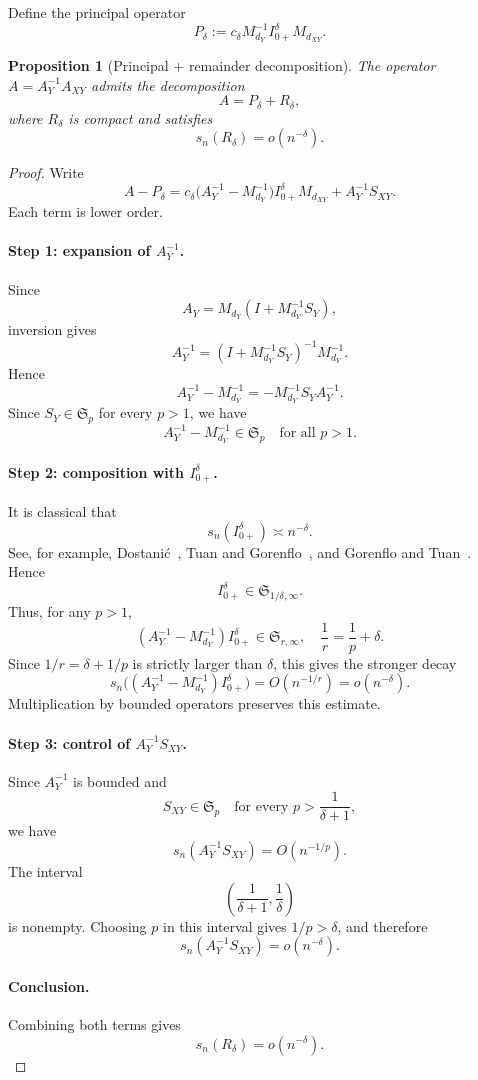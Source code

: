 \documentclass[11pt,a4paper]{amsart}
\theoremstyle{plain}
\newtheorem{proposition}[theorem]{Proposition}
\theoremstyle{definition}
\theoremstyle{remark}
\begin{document}
Define the principal operator
\[
P_\delta := c_\delta M_{d_Y}^{-1} I_{0+}^{\delta} M_{d_{XY}}.
\]

\begin{proposition}[Principal + remainder decomposition]\label{prop:A_decomposition}
The operator $A = A_Y^{-1} A_{XY}$ admits the decomposition
\[
A = P_\delta + R_\delta,
\]
where $R_\delta$ is compact and satisfies
\[
s_n(R_\delta) = o(n^{-\delta}).
\]
\end{proposition}

\begin{proof}
Write
\[
A - P_\delta
=
c_\delta \bigl(A_Y^{-1} - M_{d_Y}^{-1}\bigr) I_{0+}^{\delta} M_{d_{XY}}
+
A_Y^{-1} S_{XY}.
\]
Each term is lower order.

\paragraph{Step 1: expansion of $A_Y^{-1}$.}
Since
\[
A_Y = M_{d_Y}(I + M_{d_Y}^{-1} S_Y),
\]
inversion gives
\[
A_Y^{-1} = (I + M_{d_Y}^{-1} S_Y)^{-1} M_{d_Y}^{-1}.
\]
Hence
\[
A_Y^{-1} - M_{d_Y}^{-1}
=
- M_{d_Y}^{-1} S_Y A_Y^{-1}.
\]
Since $S_Y \in \mathfrak S_p$ for every $p>1$, we have
\[
A_Y^{-1} - M_{d_Y}^{-1} \in \mathfrak S_p
\quad\text{for all } p>1.
\]

\paragraph{Step 2: composition with $I_{0+}^{\delta}$.}
It is classical that
\[
s_n(I_{0+}^{\delta}) \asymp n^{-\delta}.
\]
See, for example, Dostani\'c~\cite{Dos93}, Tuan and Gorenflo~\cite{TG94}, and
Gorenflo and Tuan~\cite{GT95}.
Hence
\[
I_{0+}^{\delta} \in \mathfrak S_{1/\delta,\infty}.
\]
Thus, for any $p>1$,
\[
(A_Y^{-1} - M_{d_Y}^{-1}) I_{0+}^{\delta}
\in \mathfrak S_{r,\infty},
\quad
\frac1r = \frac1p + \delta.
\]
Since $1/r=\delta+1/p$ is strictly larger than $\delta$, this gives the stronger decay
\[
s_n\bigl((A_Y^{-1} - M_{d_Y}^{-1}) I_{0+}^{\delta}\bigr)
=O(n^{-1/r})=o(n^{-\delta}).
\]
Multiplication by bounded operators preserves this estimate.

\paragraph{Step 3: control of $A_Y^{-1} S_{XY}$.}
Since $A_Y^{-1}$ is bounded and
\[
S_{XY} \in \mathfrak S_p \quad \text{for every } p > \frac{1}{\delta+1},
\]
we have
\[
s_n(A_Y^{-1} S_{XY}) = O(n^{-1/p}).
\]
The interval
\[
\left(\frac{1}{\delta+1},\frac{1}{\delta}\right)
\]
is nonempty.  Choosing $p$ in this interval gives $1/p>\delta$, and therefore
\[
s_n(A_Y^{-1} S_{XY}) = o(n^{-\delta}).
\]

\paragraph{Conclusion.}
Combining both terms gives
\[
s_n(R_\delta) = o(n^{-\delta}).
\]
\end{proof}
\end{document}
